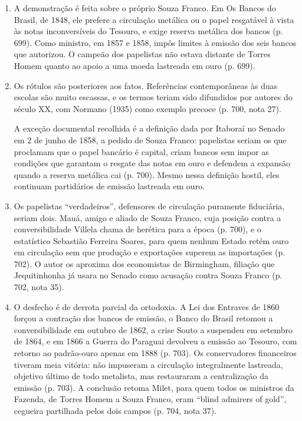 \begin{enumerate}[leftmargin=*,nosep]
\item A demonstração é feita sobre o próprio Souza Franco. Em Os Bancos do
Brasil, de 1848, ele prefere a circulação metálica ou o papel resgatável à vista
às notas inconversíveis do Tesouro, e exige reserva metálica dos bancos (p. 699).
Como ministro, em 1857 e 1858, impôs limites à emissão dos seis bancos que
autorizou. O campeão dos papelistas não estava distante de Torres Homem quanto ao
apoio a uma moeda lastreada em ouro (p. 699).


\item Os rótulos são posteriores aos fatos. Referências contemporâneas às duas
escolas são muito escassas, e os termos teriam sido difundidos por autores do
século XX, com Normano (1935) como exemplo precoce (p. 700, nota 27).


A exceção documental recolhida é a definição dada por Itaboraí no Senado em 2 de
junho de 1858, a pedido de Souza Franco: papelistas seriam os que proclamam que o
papel bancário é capital, criam bancos sem impor as condições que garantam o
resgate das notas em ouro e defendem a expansão quando a reserva metálica cai
(p. 700). Mesmo nessa definição hostil, eles continuam partidários de emissão
lastreada em ouro.

\item Os papelistas ``verdadeiros'', defensores de circulação puramente
fiduciária, seriam dois. Mauá, amigo e aliado de Souza Franco, cuja posição
contra a conversibilidade Villela chama de herética para a época (p. 700), e o
estatístico Sebastião Ferreira Soares, para quem nenhum Estado retém ouro em
circulação sem que produção e exportações superem as importações (p. 702). O
autor os aproxima dos economistas de Birmingham, filiação que Jequitinhonha já
usara no Senado como acusação contra Souza Franco (p. 702, nota 35).

\item O desfecho é de derrota parcial da ortodoxia. A Lei dos Entraves de 1860
forçou a contração dos bancos de emissão, o Banco do Brasil retomou a
conversibilidade em outubro de 1862, a crise Souto a suspendeu em setembro de
1864, e em 1866 a Guerra do Paraguai devolveu a emissão ao Tesouro, com retorno
ao padrão-ouro apenas em 1888 (p. 703). Os conservadores financeiros tiveram meia
vitória: não impuseram a circulação integralmente lastreada, objetivo último de
todo metalista, mas restauraram a centralização da emissão (p. 703). A conclusão
retoma Milet, para quem todos os ministros da Fazenda, de Torres Homem a Souza
Franco, eram ``blind admirers of gold'', cegueira partilhada pelos dois campos
(p. 704, nota 37).
\end{enumerate}

